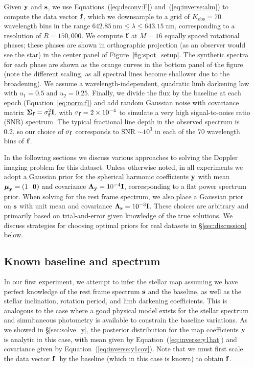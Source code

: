\documentclass[modern]{aastex631}
\begin{document}
Given ${\mathbf{y}}$ and ${\mathbf{s}}$, we use Equations~(\ref{eq:deconv:F}) and~(\ref{eq:inverse:alm}) to compute the data vector ${\mathbf{f}}$, which we downsample to a grid of 
%
$K_\mathrm{obs} = 70$ 
%
wavelength bins in the range $642.85~\mathrm{nm} \leq \lambda \leq 643.15~\mathrm{nm}$, corresponding to a resolution of
%
$R = 150,000$.
%
We compute ${\mathbf{f}}$ at $M = 16$ equally spaced rotational phases; these phases are shown in orthographic projection (as an observer would see the star) in the center panel of Figure~\ref{fig:spot_setup}. 
The synthetic spectra for each phase are shown as the orange curves in the bottom panel of the figure (note the different scaling, as all spectral lines become shallower due to the broadening). 
%
We assume a wavelength-independent, quadratic limb darkening law with $u_1 = 0.5$ and $u_2 = 0.25$. 
Finally, we divide the flux by the baseline at each epoch (Equation~\ref{eq:norm:f}) and add random Gaussian noise with covariance matrix $\boldsymbol{\Sigma}_{\mathbf{f}} = \sigma_{\mathbf{f}}^2 \mathbf{I}$, with $\sigma_{\mathbf{f}} = 2\times 10^{-4}$ to simulate a very high signal-to-noise ratio (SNR) spectrum. 
The typical fractional line depth in the observed spectrum is 0.2,
so our choice of $\sigma_{\mathbf{f}}$ corresponds to SNR $\sim 10^{3}$ in each of the 70 wavelength bins of ${\mathbf{f}}$.

In the following sections we discuss various approaches to solving the Doppler imaging problem for this dataset.
Unless otherwise noted, in all experiments we adopt a Gaussian prior for the spherical harmonic coefficients ${\mathbf{y}}$ with mean $\boldsymbol{\mu}_\bvec{y} = \left(1 \quad\quad \bvec{0}\right)$ and covariance $\boldsymbol{\Lambda}_{\mathbf{y}} = 10^{-4} {\mathbf{I}}$, corresponding to a flat power spectrum prior.
When solving for the rest frame spectrum, we also place a Gaussian prior on ${\mathbf{s}}$ with unit mean and covariance $\boldsymbol{\Lambda}_{\mathbf{s}} = 10^{-3}{\mathbf{I}}$.
These choices are arbitrary and primarily based on trial-and-error given knowledge of the true solutions. We discuss strategies for choosing optimal priors for real datasets in \S\ref{sec:discussion} below.

\subsection{Known baseline and spectrum}
\label{sec:spot_y1}
%
In our first experiment, we attempt to infer the stellar map assuming we have perfect knowledge of the rest frame spectrum ${\mathbf{s}}$ and the baseline, as well as the stellar inclination, rotation period, and limb darkening coefficients.
This is analogous to the case where a good physical model exists for the stellar spectrum and simultaneous photometry is available to constrain the baseline variations.
As we showed in \S\ref{sec:solve_y}, the posterior distribution for the map coefficients ${\mathbf{y}}$ is analytic in this case, with mean given by Equation~(\ref{eq:inverse:y1hat})
and covariance given by Equation~(\ref{eq:inverse:y1cov}). 
Note that we must first scale the data vector $\tilde{{\mathbf{f}}\hspace{0.2em}}$ by the baseline (which in this case is known) to obtain ${\mathbf{f}}$.
\end{document}

